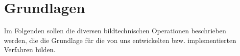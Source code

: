\chapter{Grundlagen}
\writtenby{\dcauthornameewie}%
Im Folgenden sollen die diversen bildtechnischen Operationen beschrieben werden, die die Grundlage für die von uns entwickelten bzw. implementierten Verfahren bilden.









